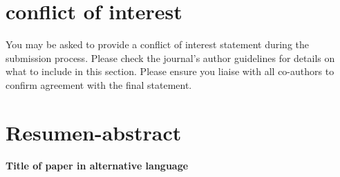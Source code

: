 \documentclass[alpha-refs,serif]{ecotropicos-article}
\begin{document}
\begin{multicols}{2}
\section*{conflict of interest}
You may be asked to provide a conflict of interest statement during the submission process. Please check the journal's author guidelines for details on what to include in this section. Please ensure you liaise with all co-authors to confirm agreement with the final statement.

\section*{Resumen-abstract}

\textbf{\Large{Title of paper in alternative language}}

\end{multicols}

\begin{multicols*}{2}







\end{multicols*}


\end{document}
